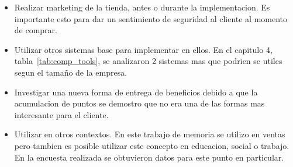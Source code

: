 \begin{itemize}

\item Realizar marketing de la tienda, antes o durante la implementacion. Es importante esto para dar
un sentimiento de seguridad al cliente al momento de comprar.

\item Utilizar otros sistemas base para implementar {\GAM} en ellos. En el capitulo 4, tabla~\ref{tab:comp_tools}, 
se analizaron 2 sistemas mas que podrien se utiles segun el tamaño de la empresa.

\item Investigar una nueva forma de entrega de beneficios debido a que la acumulacion de puntos
se demostro que no era una de las formas mas interesante para el cliente.

\item Utilizar {\GAM} en otros contextos. En este trabajo de memoria se utilizo en ventas pero tambien 
es posible utilizar este concepto en educacion, social o trabajo. En la encuesta realizada se obtuvieron
datos para este punto en particular. 

\end{itemize}


